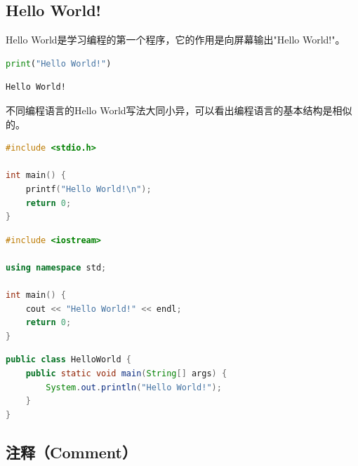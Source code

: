 \vspace{0.5cm}

\subsection{Hello World!}

Hello World是学习编程的第一个程序，它的作用是向屏幕输出"Hello World!"。\\


\begin{lstlisting}[language=Python]
print("Hello World!")
\end{lstlisting}

\begin{tcolorbox}
	\begin{verbatim}
Hello World!
	\end{verbatim}
\end{tcolorbox}

不同编程语言的Hello World写法大同小异，可以看出编程语言的基本结构是相似的。\\


\begin{lstlisting}[language=C]
#include <stdio.h>

int main() {
	printf("Hello World!\n");
	return 0;
}
\end{lstlisting}

\vspace{0.5cm}


\begin{lstlisting}[language=C++]
#include <iostream>

using namespace std;

int main() {
	cout << "Hello World!" << endl;
	return 0;
}
\end{lstlisting}

\vspace{0.5cm}


\begin{lstlisting}[language=Java]
public class HelloWorld {
    public static void main(String[] args) {
        System.out.println("Hello World!");
    }
}
\end{lstlisting}

\vspace{0.5cm}

\subsection{注释（Comment）}


